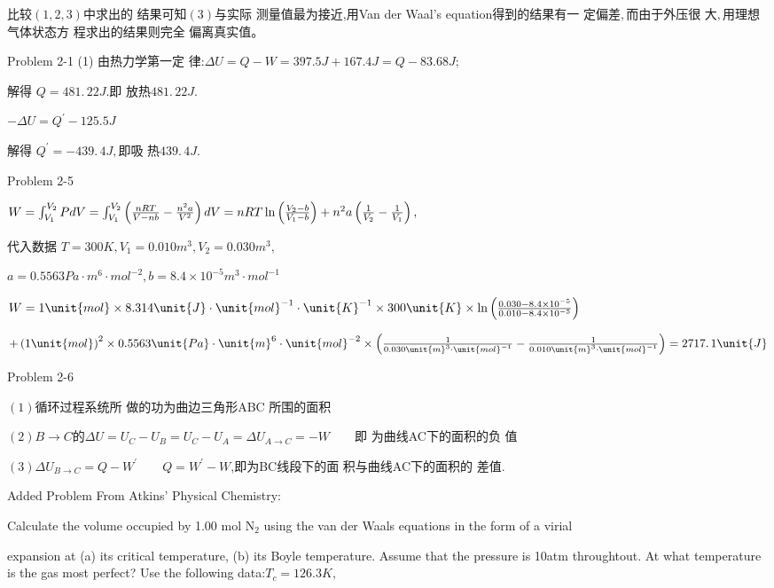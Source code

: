 \documentclass{ctexart}
\begin{document}
比较$\left( 1,2,3\right) $中求出的%
结果可知$\left( 3\right) $与实际%
测量值最为接近,用Van der
Waal's equation得到的结果有一%
定偏差$,$而由于外压很%
大$,$用理想气体状态方%
程求出的结果则完全%
偏离真实值$。 $

Problem 2-1 (1) 由热力学第一定%
律:$\Delta U=Q-W=397.5\unit{J}+167.4\unit{J}=Q-83.68\unit{J};$

解得 $Q=\allowbreak 481.\,\allowbreak 22\unit{J}.$即%
放热$\allowbreak 481.\,\allowbreak 22\unit{J}.$

$-\Delta U=Q^{\prime }-125.5\unit{J}$

解得 $Q^{\prime }=-439.\,\allowbreak 4\unit{J},$即吸%
热$439.\,\allowbreak 4\unit{J}.$

Problem 2-5

$W=\int_{V_{1}}^{V_{2}}PdV=\int_{V_{1}}^{V_{2}}\left( \frac{nRT}{V-nb}-\frac{%
n^{2}a}{V^{2}}\right) dV=nRT\ln \left( \frac{V_{2}-b}{V_{1}-b}\right)
+n^{2}a\left( \frac{1}{V_{2}}-\frac{1}{V_{1}}\right) ,$

代入数据 $T=300\unit{K},V_{1}=0.010\unit{m}%
^{3},V_{2}=0.030\unit{m}^{3},$

$a=0.5563\unit{Pa}\cdot \unit{m}^{6}\cdot \unit{mol}^{-2},b=8.4\times 10^{-5}%
\unit{m}^{3}\cdot \unit{mol}^{-1}$

$W=1\unit{mol}\times 8.314\unit{J}\cdot \unit{mol}^{-1}\cdot \unit{K}%
^{-1}\times 300\unit{K}\times \ln \left( \frac{0.030-8.4\times 10^{-5}}{%
0.010-8.4\times 10^{-5}}\right) $

$+\left( 1\unit{mol}\right) ^{2}\times 0.5563\unit{Pa}\cdot \unit{m}%
^{6}\cdot \unit{mol}^{-2}\times \left( \frac{1}{0.030\unit{m}^{3}\cdot \unit{%
mol}^{-1}}-\frac{1}{0.010\unit{m}^{3}\cdot \unit{mol}^{-1}}\right)
=\allowbreak 2717.\,\allowbreak 1\unit{J}$

Problem 2-6

$\left( 1\right) $循环过程系统所%
做的功为曲边三角形ABC%
所围的面积

$\left( 2\right) B\rightarrow C$的$\Delta
U=U_{C}-U_{B}=U_{C}-U_{A}=\Delta U_{A\rightarrow C}=-W\qquad $即%
为曲线AC下的面积的负%
值

$\left( 3\right) \Delta U_{B\rightarrow C}=Q-W^{\prime }\qquad Q=W^{\prime
}-W$,\qquad 即为BC线段下的面%
积与曲线AC下的面积的%
差值.

Added Problem From Atkins' Physical Chemistry:

Calculate the volume occupied by 1.00 mol N$_{2}$ using the van der Waals
equations in the form of a virial

expansion at (a) its critical temperature, (b) its Boyle temperature. Assume
that the pressure is 10atm throughtout. At what temperature is the gas most
perfect? Use the following data:$T_{c}=126.3\unit{K},$
\end{document}
